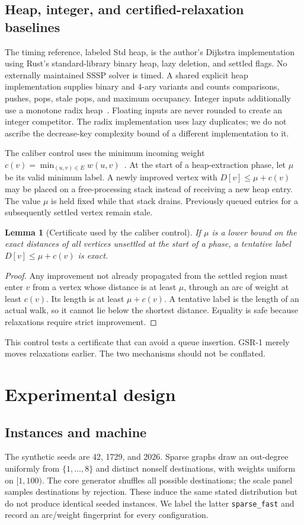 \documentclass[11pt]{article}
\newtheorem{lemma}{Lemma}
\newcommand{\code}[1]{\texttt{#1}}
\begin{document}
\subsection{Heap, integer, and certified-relaxation baselines}
The timing reference, labeled Std heap, is the author's Dijkstra implementation
using Rust's standard-library binary heap, lazy deletion, and settled flags.
No externally maintained SSSP solver is timed. A shared explicit
heap implementation supplies binary and 4-ary variants and counts comparisons,
pushes, pops, stale pops, and maximum occupancy. Integer inputs additionally use
a monotone radix heap~\cite{radix}. Floating inputs are never rounded to create
an integer competitor. The radix implementation uses lazy duplicates; we do not
ascribe the decrease-key complexity bound of a different implementation to it.

The caliber control uses the minimum incoming weight
$c(v)=\min_{(u,v)\in E}w(u,v)$~\cite{goldberg}. At the start of a heap-extraction
phase, let $\mu$ be its valid minimum label. A newly improved vertex with
$D[v]\le\mu+c(v)$ may be placed on a free-processing stack instead of receiving
a new heap entry. The value $\mu$ is held fixed while that stack drains.
Previously queued entries for a subsequently settled vertex remain stale.

\begin{lemma}[Certificate used by the caliber control]
If $\mu$ is a lower bound on the exact distances of all vertices unsettled at
the start of a phase, a tentative label $D[v]\le\mu+c(v)$ is exact.
\end{lemma}
\begin{proof}
Any improvement not already propagated from the settled region must enter $v$
from a vertex whose distance is at least $\mu$, through an arc of weight at
least $c(v)$. Its length is at least $\mu+c(v)$. A tentative label is the length
of an actual walk, so it cannot lie below the shortest distance. Equality is
safe because relaxations require strict improvement.
\end{proof}
This control tests a certificate that can avoid a queue insertion. GSR-1 merely
moves relaxations earlier. The two mechanisms should not be conflated.

\section{Experimental design}
\subsection{Instances and machine}

The synthetic seeds are 42, 1729, and 2026. Sparse graphs draw an out-degree
uniformly from $\{1,\ldots,8\}$ and distinct nonself destinations, with weights
uniform on $[1,100)$. The core generator shuffles all possible destinations;
the scale panel samples destinations by rejection. These induce the same stated
distribution but do not produce identical seeded instances. We label the latter
\code{sparse\_fast} and record an arc/weight fingerprint for every configuration.
\end{document}

